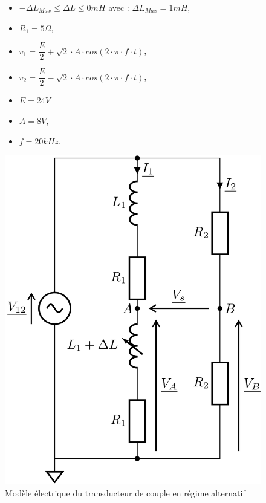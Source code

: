 \begin{figure}[ht!]
\begin{minipage}{0.45\linewidth}
\begin{itemize}
 \item $-\Delta L_{Max}\leq\Delta L\leq 0mH$ avec : $\Delta L_{Max}=1mH$,
 \item $R_1=5\Omega$,
 \item $v_1=\dfrac{E}{2}+\sqrt{2}\cdot A\cdot cos(2\cdot\pi\cdot f\cdot t)$,
 \item $v_2=\dfrac{E}{2}-\sqrt{2}\cdot A\cdot cos(2\cdot\pi\cdot f\cdot t)$,
 \item $E=24V$
 \item $A=8V$,
 \item $f=20kHz$.
\end{itemize}
\end{minipage}
\end{figure}

\begin{figure}[ht!]
\begin{minipage}{0.45\linewidth}
\begin{center}
\includegraphics[width=.75\linewidth]{img/fig10}
\caption{\label{fig10}Modèle électrique du transducteur de couple en régime alternatif}
\end{center}
\end{minipage}\hfill
\begin{minipage}{0.45\linewidth}


\end{minipage}
\end{figure}

